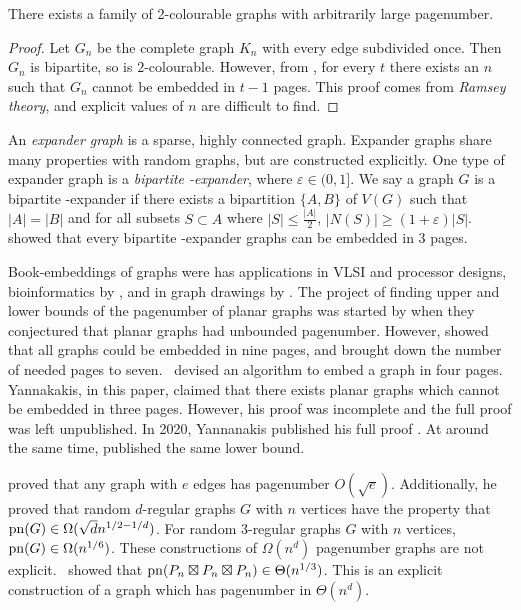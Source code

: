 \begin{theorem}
	There exists a family of 2-colourable graphs with arbitrarily large pagenumber.
\end{theorem}
\begin{proof}
	Let $G_n$ be the complete graph $K_n$ with every edge subdivided once. Then $G_n$ is bipartite, so is $2$-colourable. However, from \textcite{eppsteinSeparatingThicknessGeometric2002}, for every $t$ there exists an $n$ such that $G_n$ cannot be embedded in $t-1$ pages. This proof comes from \textit{Ramsey theory}, and explicit values of $n$ are difficult to find. 
\end{proof}

An \textit{expander graph} is a sparse, highly connected graph. Expander graphs share many properties with random graphs, but are constructed explicitly. One type of expander graph is a \textit{bipartite \varepsilon-expander}, where $\varepsilon \in (0, 1]$. We say a graph $G$ is a bipartite \varepsilon-expander if there exists a bipartition $ \{A, B\}$ of $V(G)$ such that $|A| = |B|$ and for all subsets $S \subset A$ where $|S| \leq \frac{|A|}{2}$, $|N(S)| \geq (1 + \varepsilon) |S|$. 
\textcite{dujmovicLayoutsExpanderGraphs2016} showed that every bipartite \varepsilon-expander graphs can be embedded in 3 pages. 


Book-embeddings of graphs were has applications in VLSI and processor designs, bioinformatics by \textcite{haslingerRNAStructuresPseudoknots1999}, and in graph drawings by \textcite{woodBoundedDegreeBook2002}. 
The project of finding upper and lower bounds of the pagenumber of planar graphs was started by \textcite{bernhartBookThicknessGraph1979} when they conjectured that planar graphs had unbounded pagenumber. However, \textcite{bussPagenumberPlanarGraphs1984} showed that all graphs could be embedded in nine pages, and \textcite{heathEmbeddingPlanarGraphs1984} brought down the number of needed pages to seven.\ \textcite{yannakakisEmbeddingPlanarGraphs1989} devised an algorithm to embed a graph in four pages. Yannakakis, in this paper, claimed that there exists planar graphs which cannot be embedded in three pages. However, his proof was incomplete and the full proof was left unpublished. In 2020, Yannanakis published his full proof \cite{yannakakisPlanarGraphsThat2020}. At around the same time, \textcite{kaufmannFourPagesAre2020} published the same lower bound.

\textcite{malitzGraphsEdgesHave1994} proved that any graph with $e$ edges has pagenumber $O(\sqrt{e})$. Additionally, he proved that random $d$-regular graphs $G$ with $n$ vertices have the property that $\operatorname{pn}(G) \in \Omega(\sqrt{d} n^{1/2 - 1/d})$. For random 3-regular graphs $G$ with $n$ vertices, $\operatorname{pn}(G) \in \Omega(n^{1/6})$. These constructions of $\Omega(n^d)$ pagenumber graphs are not explicit.\ \textcite{eppsteinThreeDimensionalGraphProducts2024} showed that $\operatorname{pn}(P_n \boxtimes P_n \boxtimes P_n) \in \Theta(n^{1/3})$. This is an explicit construction of a graph which has pagenumber in $\Theta(n^{d})$. 
